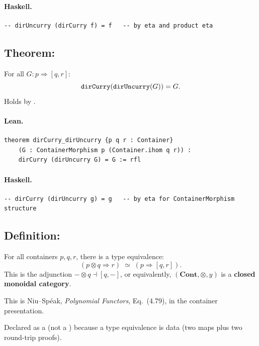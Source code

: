 \documentclass[11pt,a4paper]{article}
\begin{document}
\paragraph{Haskell.}
\begin{lstlisting}[style=haskell]
-- dirUncurry (dirCurry f) = f   -- by eta and product eta
\end{lstlisting}


\subsection{Theorem: }

\begin{thm}
For all $G : p \Rightarrow [q, r]$:
\[
  \texttt{dirCurry}(\texttt{dirUncurry}(G)) = G.
\]
Holds by .
\end{thm}

\paragraph{Lean.}
\begin{lstlisting}[style=lean]
theorem dirCurry_dirUncurry {p q r : Container}
    (G : ContainerMorphism p (Container.ihom q r)) :
    dirCurry (dirUncurry G) = G := rfl
\end{lstlisting}

\paragraph{Haskell.}
\begin{lstlisting}[style=haskell]
-- dirCurry (dirUncurry g) = g   -- by eta for ContainerMorphism structure
\end{lstlisting}


\subsection{Definition: }

\begin{defn}
For all containers $p, q, r$, there is a type equivalence:
\[
  (p \otimes q \Rightarrow r) \;\simeq\; (p \Rightarrow [q, r]).
\]
This is the adjunction $- \otimes q \dashv [q, -]$, or equivalently,
$(\mathbf{Cont}, \otimes, y)$ is a \textbf{closed monoidal category}.

This is Niu--Sp\'{e}ak, \emph{Polynomial Functors}, Eq.~(4.79), in the
container presentation.

Declared as a  (not a ) because a type equivalence is
data (two maps plus two round-trip proofs).
\end{defn}
\end{document}
